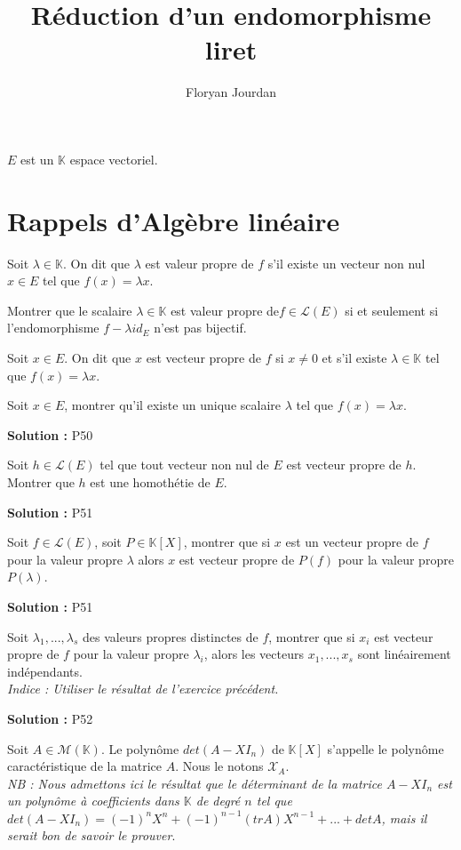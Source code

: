 \documentclass[12pt,a4paper]{article}
\title{Réduction d'un endomorphisme liret}
\author{Floryan Jourdan}
\newcommand{\K}{\mathbb{K}}
\newcommand{\Mm}{\mathcal{M}}
\newcommand{\Chi}{\mathcal{X}}
\newcommand{\Ll}{\mathcal{L}}
\def\be{\begin{exo}}
\def\ee{\end{exo}}
\def\bd{\begin{df}}
\def\ed{\end{df}}
\newcommand{\solution}[1]{\par\noindent\textbf{\color{OliveGreen}Solution :} \textcolor{OliveGreen}{#1}}
\begin{document}
\maketitle

$E$ est un $\K$ espace vectoriel.
\section{Rappels d'Algèbre linéaire}

\bd
Soit $\lambda \in \K$. On dit que $\lambda$ est valeur propre de $f$ s'il existe un vecteur non nul $x\in E$ tel que $f(x) = \lambda x$.
\ed

\be
Montrer que le scalaire $\lambda \in \K$ est valeur propre de$f \in \Ll(E)$ si et seulement si l'endomorphisme $f-\lambda id_E$ n'est pas bijectif.
\ee
\bd
	Soit $x \in E$. On dit que $x$ est vecteur propre de $f$ si $x \ne 0$ et s'il existe $\lambda \in \K$ tel que $f(x) = \lambda x$.
\ed

\begin{exo}
	Soit $x \in E$, montrer qu'il existe un unique scalaire $\lambda$ tel que $f(x) = \lambda x$.
	\solution{P50}
\end{exo}

\be
Soit $h \in \Ll(E)$ tel que tout vecteur non nul de $E$ est vecteur propre de $h$. Montrer que $h$ est une homothétie de $E$.
\solution{P51}
\ee

\begin{exo}	
	Soit $f \in \Ll(E)$, soit $P \in \K[X]$, montrer que si $x$ est un vecteur propre de $f$ pour la valeur propre $\lambda$ alors $x$ est vecteur propre de $P(f)$ pour la valeur propre $P(\lambda)$. 
	\solution{P51}
\end{exo}

\begin{exo}
	Soit $\lambda_1,...,\lambda_s$ des valeurs propres distinctes de $f$, montrer que si $x_i$ est vecteur propre de $f$ pour la valeur propre $\lambda_i$, alors les vecteurs $x_1,...,x_s$ sont linéairement indépendants.\\
	\textit{Indice : Utiliser le résultat de l'exercice précédent.}
	\solution{P52}
\end{exo}

\bd
Soit $A \in \Mm(\K)$. Le polynôme $det(A - XI_n)$ de $\K[X]$ s'appelle le polynôme caractéristique de la matrice $A$. Nous le notons $\Chi_A$.\\
\textit{NB : Nous admettons ici le résultat que le déterminant de la matrice $A-XI_n$ est un polynôme à coefficients dans $\K$ de degré $n$ tel que $det(A-XI_n) = (-1)^nX^n+(-1)^{n-1}(trA)X^{n-1}+...+detA$, mais il serait bon de savoir le prouver}.
\ed
\end{document}
